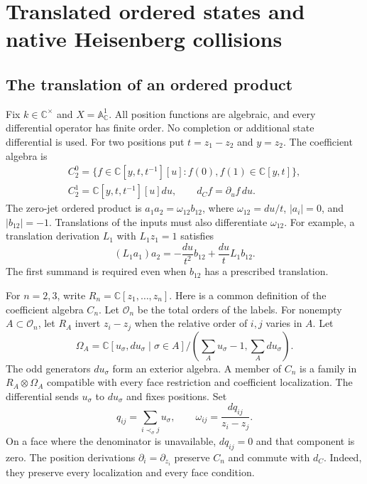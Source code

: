\providecommand{\pp}{\operatorname{pp}}
\chapter{Translated ordered states and native Heisenberg collisions}
\label{chap:bdtr-source}

\section{The translation of an ordered product}

Fix $k\in\mathbb C^\times$ and $X=\mathbb A^1_{\mathbb C}$.
All position functions are algebraic, and every differential operator has finite order.
No completion or additional state differential is used.
For two positions put $t=z_1-z_2$ and $y=z_2$.
The coefficient algebra is
\[
 \begin{gathered}
 C_2^0=\{f\in\mathbb C[y,t,t^{-1}][u]:f(0),f(1)\in\mathbb C[y,t]\},\\
 C_2^1=\mathbb C[y,t,t^{-1}][u]du,
 \qquad d_Cf=\partial_uf\,du.
 \end{gathered}
\]
The zero-jet ordered product is $a_1a_2=\omega_{12}b_{12}$, where
$\omega_{12}=du/t$, $|a_i|=0$, and $|b_{12}|=-1$.
Translations of the inputs must also differentiate $\omega_{12}$.
For example, a translation derivation $L_1$ with $L_1z_1=1$ satisfies
\begin{equation}\label{eq:bdtr-first-jet}
 (L_1a_1)a_2=-\frac{du}{t^2}b_{12}
                 +\frac{du}{t}L_1b_{12}.
\end{equation}
The first summand is required even when $b_{12}$ has a prescribed translation.

For $n=2,3$, write $R_n=\mathbb C[z_1,\ldots,z_n]$.
Here is a common definition of the coefficient algebra $C_n$.
Let $\mathcal O_n$ be the total orders of the labels.
For nonempty $A\subset\mathcal O_n$, let $R_A$ invert $z_i-z_j$ when the relative order of $i,j$ varies in $A$.
Let
\[
 \Omega_A=\mathbb C[u_\sigma,du_\sigma\mid\sigma\in A]
 /(\textstyle\sum_Au_\sigma-1,\sum_Adu_\sigma).
\]
The odd generators $du_\sigma$ form an exterior algebra.
A member of $C_n$ is a family in $R_A\otimes\Omega_A$ compatible with every face restriction and coefficient localization.
The differential sends $u_\sigma$ to $du_\sigma$ and fixes positions.
Set
\[
 q_{ij}=\sum_{i\prec_\sigma j}u_\sigma,
 \qquad \omega_{ij}=\frac{dq_{ij}}{z_i-z_j}.
\]
On a face where the denominator is unavailable, $dq_{ij}=0$ and that component is zero.
The position derivations $\partial_i=\partial_{z_i}$ preserve $C_n$ and commute with $d_C$.
Indeed, they preserve every localization and every face condition.


